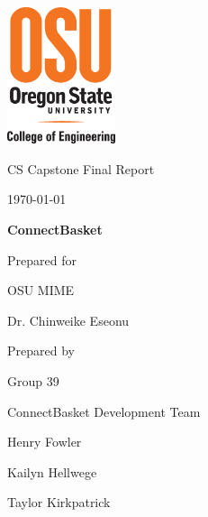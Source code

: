 \documentclass[onecolumn, draftclsnofoot,10pt, compsoc]{IEEEtran}
\def \CapstoneTeamName{		ConnectBasket Development Team}
\def \CapstoneTeamNumber{		39}
\def \GroupMemberOne{			Henry Fowler}
\def \GroupMemberTwo{			Kailyn Hellwege}
\def \GroupMemberThree{			Taylor Kirkpatrick}
\def \CapstoneProjectName{		ConnectBasket}
\def \CapstoneSponsorCompany{	OSU MIME}
\def \CapstoneSponsorPerson{		Dr. Chinweike Eseonu}
\def \DocType{		%
				Final Report
				}
\newcommand{\NameSigPair}[1]{\par
\makebox[2.75in][r]{#1} \hfil 	\makebox[3.25in]{\makebox[2.25in]{\hrulefill} \hfill		\makebox[.75in]{\hrulefill}}
\par\vspace{-12pt} \textit{\tiny\noindent
\makebox[2.75in]{} \hfil		\makebox[3.25in]{\makebox[2.25in][r]{Signature} \hfill	\makebox[.75in][r]{Date}}}}
\renewcommand{\NameSigPair}[1]{#1}
\begin{document}
\begin{titlepage}
    \begin{singlespace}
    	\includegraphics[height=4cm]{coe_v_spot1}
        \hfill 
        \par\vspace{.2in}
        \centering
        \scshape{
            \huge CS Capstone \DocType \par
            {\large\today}\par
            \vspace{.5in}
            \textbf{\Huge\CapstoneProjectName}\par
            \vfill
            {\large Prepared for}\par
            \Huge \CapstoneSponsorCompany\par
            \vspace{5pt}
            {\Large\NameSigPair{\CapstoneSponsorPerson}\par}
            {\large Prepared by }\par
            Group\CapstoneTeamNumber\par
            \CapstoneTeamName\par 
            \vspace{5pt}
            {\Large
                \NameSigPair{\GroupMemberOne}\par
                \NameSigPair{\GroupMemberTwo}\par
                \NameSigPair{\GroupMemberThree}\par
            }
            \vspace{20pt}
        }
        \begin{abstract}
        

        \end{abstract}     
    \end{singlespace}
\end{titlepage}
\newpage
{}
\tableofcontents
\clearpage
\end{document}
